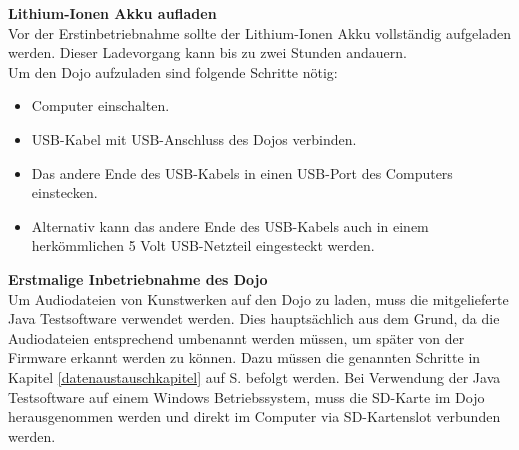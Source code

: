 \textbf{Lithium-Ionen Akku aufladen}
\\[4mm]
Vor der Erstinbetriebnahme sollte der Lithium-Ionen Akku vollständig aufgeladen werden. Dieser Ladevorgang kann bis zu zwei Stunden andauern.
\\[4mm]
Um den Dojo aufzuladen sind folgende Schritte nötig:
\begin{itemize}
\item Computer einschalten.
\end{itemize}
\begin{itemize}
\item USB-Kabel mit USB-Anschluss des Dojos verbinden.
\end{itemize}
\begin{itemize}
\item Das andere Ende des USB-Kabels in einen USB-Port des Computers einstecken.
\end{itemize}
\begin{itemize}
\item Alternativ kann das andere Ende des USB-Kabels auch in einem herkömmlichen 5 Volt USB-Netzteil eingesteckt werden.
\end{itemize}
\textbf{Erstmalige Inbetriebnahme des Dojo}
\\[4mm]
Um Audiodateien von Kunstwerken auf den Dojo zu laden, muss die mitgelieferte Java Testsoftware verwendet werden. Dies hauptsächlich aus dem Grund, da die Audiodateien entsprechend umbenannt werden müssen, um später von der Firmware erkannt werden zu können. Dazu müssen die genannten Schritte in Kapitel \ref{datenaustauschkapitel} auf S.\pageref{datenaustauschkapitel} befolgt werden. Bei Verwendung der Java Testsoftware auf einem Windows Betriebssystem, muss die SD-Karte im Dojo herausgenommen werden und direkt im Computer via SD-Kartenslot verbunden werden.
